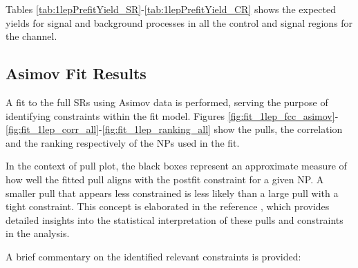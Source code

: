 Tables \ref{tab:1lepPrefitYield_SR}-\ref{tab:1lepPrefitYield_CR} shows the expected yields for signal and background processes 
in all the control and signal regions for the \olep channel.




\clearpage
\subsection{Asimov Fit Results}


A fit to the full SRs using Asimov data is performed, 
serving the purpose of identifying constraints within the fit model.
Figures \ref{fig:fit_1lep_fcc_asimov}-\ref{fig:fit_1lep_corr_all}-\ref{fig:fit_1lep_ranking_all}
show the pulls, the correlation and the ranking respectively of the NPs used in the fit.

In the context of pull plot,
the black boxes represent an approximate measure of how well the fitted pull aligns with the postfit constraint for a given NP.
A smaller pull that appears less constrained is less likely than a large pull with a tight constraint.
This concept is elaborated in the reference \cite{morange:tel-03341303}, 
which provides detailed insights into the statistical interpretation of these pulls and constraints in the analysis.

A brief commentary on the identified relevant constraints is provided:

